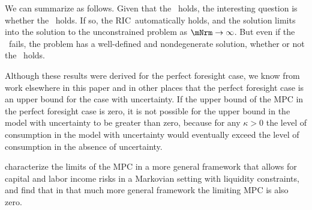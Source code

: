\documentclass[\econtexRoot/BufferStockTheory]{subfiles}
\begin{document}
We can summarize as follows.
Given that the \GICRaw~holds, the interesting question is whether the \FHWC~holds.
If so, the RIC~automatically holds, and the solution limits into the solution to the unconstrained problem as $\mNrm \rightarrow \infty$.
But even if the \FHWC~fails, the problem has a well-defined and nondegenerate solution, whether or not the \RIC~holds.

Although these results were derived for the perfect foresight case, we know from work elsewhere in this paper and in other places that the perfect foresight case is an upper bound for the case with uncertainty.
If the upper bound of the MPC in the perfect foresight case is zero, it is not possible for the upper bound in the model with uncertainty to be greater than zero, because for any $\kappa > 0$ the level of consumption in the model with uncertainty would eventually exceed the level of consumption in the absence of uncertainty.

\cite{maTodaRich} characterize the limits of the MPC in a more general framework that allows for capital and labor income risks in a Markovian setting with liquidity constraints, and find that in that much more general framework the limiting MPC is also zero.%

\ifSubfilesClassLoaded{\bibfilesfind{\texname}}{}
\end{document}
